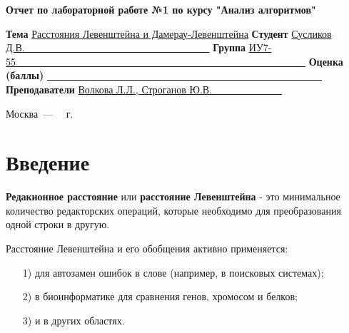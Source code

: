 \documentclass[12pt]{report}
\begin{document}
\begin{titlepage}
		
		\begin{center}
			\Large\textbf{Отчет по лабораторной работе №1 \newline по курсу "Анализ алгоритмов"}\newline
		\end{center}
		
		\noindent\textbf{Тема} \underline{Расстояния Левенштейна и Дамерау-Левенштейна}
		\newline\newline\newline
		\noindent\textbf{Студент} \underline{Сусликов Д.В.~~~~~~~~~~~~~~~~~~~~~~~~~~~~~~~~~~~~~}
		\newline\newline
		\noindent\textbf{Группа} \underline{ИУ7-55~~~~~~~~~~~~~~~~~~~~~~~~~~~~~~~~~~~~~~~~~~~~~~~~~~~~~~~~~~}
		\newline\newline
		\noindent\textbf{Оценка (баллы)} \underline{~~~~~~~~~~~~~~~~~~~~~~~~~~~~~~~~~~~~~~~~~~~~~~~~~~~~~~~}
		\newline\newline
		\noindent\textbf{Преподаватели} \underline{Волкова Л.Л., Строганов Ю.В.~~~~~~~~~~~~~~}
		\newline
		
		\begin{center}
			\vfill
			Москва~---~\the\year
			~г.
		\end{center}
		\restoregeometry
	\end{titlepage}
	
	\tableofcontents
	\onehalfspacing
	
	\newpage
	\chapter*{Введение}
	
	\textbf{Редакионное расстояние} или \textbf{расстояние Левенштейна} - это минимальное количество редакторских операций, которые необходимо для преобразования одной строки в другую.
	
	Расстояние Левенштейна и его обобщения активно применяется: 
	\begin{enumerate}
		\item[1)] для автозамен ошибок в слове (например, в поисковых системах);
		\item[2)] в биоинформатике для сравнения генов, хромосом и белков;
		\item[3)] и в других областях.
	\end{enumerate}
	
\end{document}
